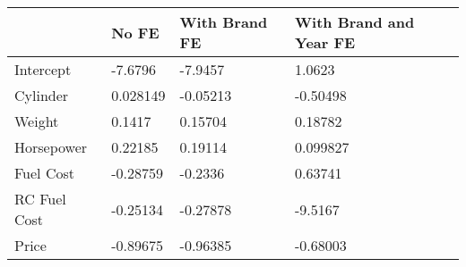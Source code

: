 \begin{tabular}{llll}
& No FE & With Brand FE & With Brand and Year FE \\ 
\hline 
Intercept & -7.6796 & -7.9457 & 1.0623 \\ 
Cylinder & 0.028149 & -0.05213 & -0.50498 \\ 
Weight & 0.1417 & 0.15704 & 0.18782 \\ 
Horsepower & 0.22185 & 0.19114 & 0.099827 \\ 
Fuel Cost & -0.28759 & -0.2336 & 0.63741 \\ 
RC Fuel Cost & -0.25134 & -0.27878 & -9.5167 \\ 
Price & -0.89675 & -0.96385 & -0.68003 \\ 
\hline 
\end{tabular}